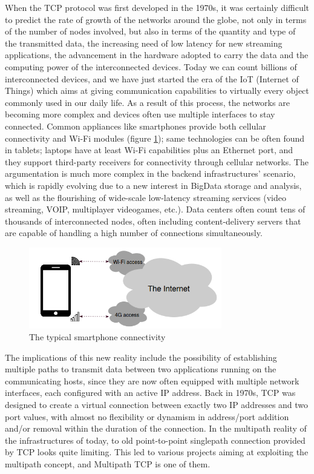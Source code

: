 When the TCP protocol was first developed in the 1970s, it was certainly difficult to predict the rate of growth of the networks around the globe, not only in terms of the number of nodes involved, but also in terms of the quantity and type of the transmitted data, the increasing need of low latency for new streaming applications, the advancement in the hardware adopted to carry the data and the computing power of the interconnected devices. Today we can count billions of interconnected devices, and we have just started the era of the IoT (Internet of Things) which aims at giving communication capabilities to virtually every object commonly used in our daily life.
As a result of this process, the networks are becoming more complex and devices often use multiple interfaces to stay connected. Common appliances like smartphones provide both cellular connectivity and Wi-Fi modules (figure \ref{fig:smartphones}); same technologies can be often found in tablets; laptops have at least Wi-Fi capabilities plus an Ethernet port, and they support third-party receivers for connectivity through cellular networks. The argumentation is much more complex in the backend infrastructures' scenario, which is rapidly evolving due to a new interest in BigData storage and analysis, as well as the flourishing of wide-scale low-latency streaming services (video streaming, VOIP, multiplayer videogames, etc.). Data centers often count tens of thousands of interconnected nodes, often including content-delivery servers that are capable of handling a high number of connections simultaneously.

\begin{figure}[!htb]
\centering
\includegraphics[width=0.75\textwidth]{images/smartphones}
\caption{The typical smartphone connectivity}
\label{fig:smartphones}
\end{figure}

The implications of this new reality include the possibility of establishing multiple paths to transmit data between two applications running on the communicating hosts, since they are now often equipped with multiple network interfaces, each configured with an active IP address. Back in 1970s, TCP was designed to create a virtual connection between exactly two IP addresses and two port values, with almost no flexibility or dynamism in address/port addition and/or removal within the duration of the connection. In the multipath reality of the infrastructures of today, to old point-to-point singlepath connection provided by TCP looks quite limiting. This led to various projects aiming at exploiting the multipath concept, and Multipath TCP is one of them.


